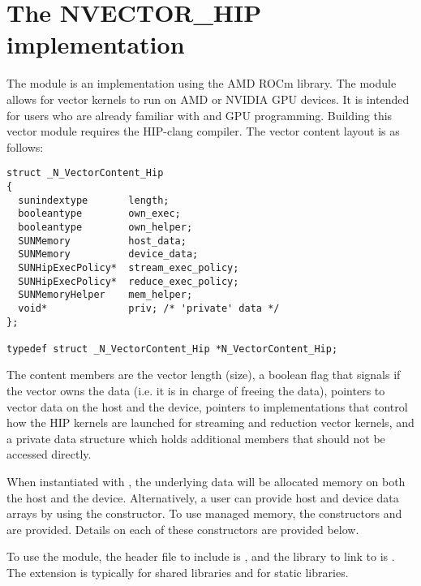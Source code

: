 %
\section{The NVECTOR\_HIP implementation}\label{ss:nvec_hip}

The {\nvechip} module is an {\nvector} implementation using the AMD ROCm {\hip}
library. The module allows for {\sundials} vector kernels to run on AMD or
NVIDIA GPU devices. It is intended for users who are already familiar with
{\hip} and GPU programming. Building this vector module requires the HIP-clang
compiler. The vector content layout is as follows:

\begin{verbatim}
struct _N_VectorContent_Hip
{
  sunindextype       length;
  booleantype        own_exec;
  booleantype        own_helper;
  SUNMemory          host_data;
  SUNMemory          device_data;
  SUNHipExecPolicy*  stream_exec_policy;
  SUNHipExecPolicy*  reduce_exec_policy;
  SUNMemoryHelper    mem_helper;
  void*              priv; /* 'private' data */
};

typedef struct _N_VectorContent_Hip *N_VectorContent_Hip;
\end{verbatim}

The content members are the vector length (size), a boolean flag that signals if
the vector owns the data (i.e. it is in charge of freeing the data), pointers to
vector data on the host and the device, pointers to 
implementations that control how the HIP kernels are launched for streaming and
reduction vector kernels, and a private data structure which holds additional members
that should not be accessed directly.

When instantiated with , the underlying data will be allocated
memory on both the host and the device. Alternatively, a user can provide host
and device data arrays by using the  constructor. To use {\hip}
managed memory, the constructors  and \newline
{} are provided. Details on each of these constructors
are provided below.

To use the {\nvechip} module, the header file to include is ,
and the library to link to is . The
extension  is typically  for shared libraries and 
for static libraries.

